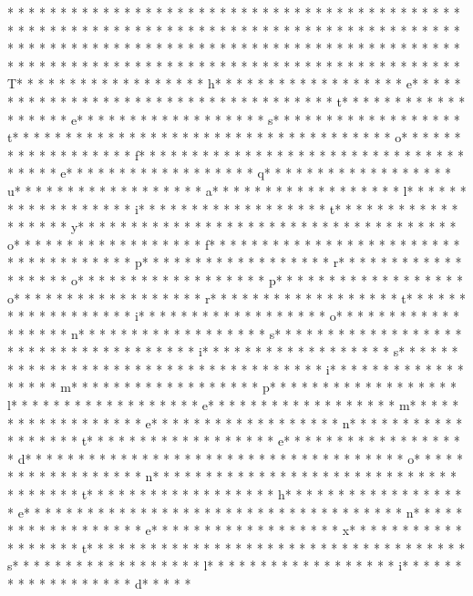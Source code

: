 * * *  * * *  * * *  *  * * *  *  * * *  * * *  * * *  *  * * *  *  * * *  * * *  * * *  *  * * *  *  * * *  *  * * *  * * *  * * *  *  * * *  *  * * *  *  * * *  * * *  * * *  *  * * *  *  * * *  *  * * *  * * *  * * *  *  * * *  *  * * *  *  * * *  * * *  * * *  *  * * *  *  * * *  *  * * *  * * *  * * *  *  * * *  *  * * *  *  * * *  * * *  * * *  *  * * *  *  * * *  *  * * *  * * *  * * *  *  * * *  *  * * *  * T* * *  * * *  * * *  *  * * *  *  * * *  * h* * *  * * *  * * *  *  * * *  *  * * *  * e* * *  * * *  * * *  *  * * *  *  * * *  *  * * *  * * *  * * *  *  * * *  *  * * *  * t* * *  * * *  * * *  *  * * *  *  * * *  * e* * *  * * *  * * *  *  * * *  *  * * *  * s* * *  * * *  * * *  *  * * *  *  * * *  * t* * *  * * *  * * *  *  * * *  *  * * *  *  * * *  * * *  * * *  *  * * *  *  * * *  * o* * *  * * *  * * *  *  * * *  *  * * *  * f* * *  * * *  * * *  *  * * *  *  * * *  *  * * *  * * *  * * *  *  * * *  *  * * *  * e* * *  * * *  * * *  *  * * *  *  * * *  * q* * *  * * *  * * *  *  * * *  *  * * *  * u* * *  * * *  * * *  *  * * *  *  * * *  * a* * *  * * *  * * *  *  * * *  *  * * *  * l* * *  * * *  * * *  *  * * *  *  * * *  * i* * *  * * *  * * *  *  * * *  *  * * *  * t* * *  * * *  * * *  *  * * *  *  * * *  * y* * *  * * *  * * *  *  * * *  *  * * *  *  * * *  * * *  * * *  *  * * *  *  * * *  * o* * *  * * *  * * *  *  * * *  *  * * *  * f* * *  * * *  * * *  *  * * *  *  * * *  *  * * *  * * *  * * *  *  * * *  *  * * *  * p* * *  * * *  * * *  *  * * *  *  * * *  * r* * *  * * *  * * *  *  * * *  *  * * *  * o* * *  * * *  * * *  *  * * *  *  * * *  * p* * *  * * *  * * *  *  * * *  *  * * *  * o* * *  * * *  * * *  *  * * *  *  * * *  * r* * *  * * *  * * *  *  * * *  *  * * *  * t* * *  * * *  * * *  *  * * *  *  * * *  * i* * *  * * *  * * *  *  * * *  *  * * *  * o* * *  * * *  * * *  *  * * *  *  * * *  * n* * *  * * *  * * *  *  * * *  *  * * *  * s* * *  * * *  * * *  *  * * *  *  * * *  *  * * *  * * *  * * *  *  * * *  *  * * *  * i* * *  * * *  * * *  *  * * *  *  * * *  * s* * *  * * *  * * *  *  * * *  *  * * *  *  * * *  * * *  * * *  *  * * *  *  * * *  * i* * *  * * *  * * *  *  * * *  *  * * *  * m* * *  * * *  * * *  *  * * *  *  * * *  * p* * *  * * *  * * *  *  * * *  *  * * *  * l* * *  * * *  * * *  *  * * *  *  * * *  * e* * *  * * *  * * *  *  * * *  *  * * *  * m* * *  * * *  * * *  *  * * *  *  * * *  * e* * *  * * *  * * *  *  * * *  *  * * *  * n* * *  * * *  * * *  *  * * *  *  * * *  * t* * *  * * *  * * *  *  * * *  *  * * *  * e* * *  * * *  * * *  *  * * *  *  * * *  * d* * *  * * *  * * *  *  * * *  *  * * *  *  * * *  * * *  * * *  *  * * *  *  * * *  * o* * *  * * *  * * *  *  * * *  *  * * *  * n* * *  * * *  * * *  *  * * *  *  * * *  *  * * *  * * *  * * *  *  * * *  *  * * *  * t* * *  * * *  * * *  *  * * *  *  * * *  * h* * *  * * *  * * *  *  * * *  *  * * *  * e* * *  * * *  * * *  *  * * *  *  * * *  *  * * *  * * *  * * *  *  * * *  *  * * *  * n* * *  * * *  * * *  *  * * *  *  * * *  * e* * *  * * *  * * *  *  * * *  *  * * *  * x* * *  * * *  * * *  *  * * *  *  * * *  * t* * *  * * *  * * *  *  * * *  *  * * *  *  * * *  * * *  * * *  *  * * *  *  * * *  * s* * *  * * *  * * *  *  * * *  *  * * *  * l* * *  * * *  * * *  *  * * *  *  * * *  * i* * *  * * *  * * *  *  * * *  *  * * *  * d* * *  * * 